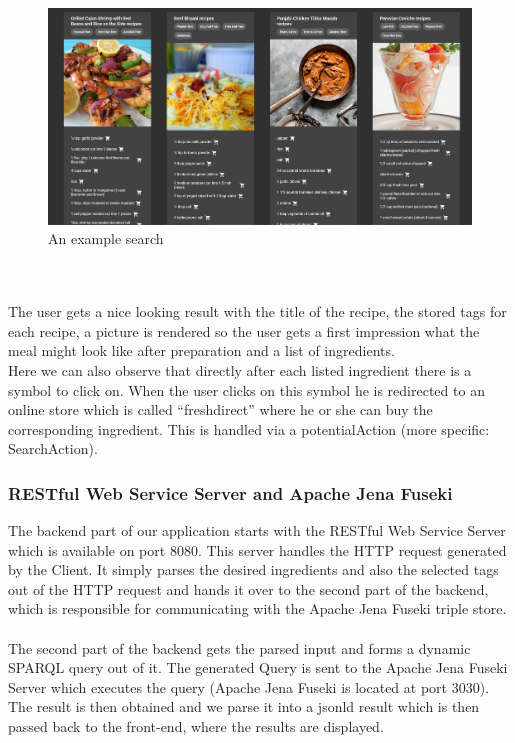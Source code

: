 \documentclass{article}
\begin{document}
\begin{figure}[H]
  \centering
  \includegraphics[width=14cm]{pictures/example_result.png}
  \caption{An example search}
  \label{fig:resp}
\end{figure}
\noindent
\\ \\
The user gets a nice looking result with the title of the recipe, the stored tags for each recipe, a picture is rendered so the user gets a first impression what the meal might look like after preparation and a list of ingredients. \\
Here we can also observe that directly after each listed ingredient there is a symbol to click on. When the user clicks on this symbol he is redirected to an online store which is called ``freshdirect'' where he or she can buy the corresponding ingredient. This is handled via a potentialAction (more specific: SearchAction).

\subsubsection{RESTful Web Service Server and Apache Jena Fuseki}
The backend part of our application starts with the RESTful Web Service Server which is available on port 8080. This server handles the HTTP request generated by the Client. It simply parses the desired ingredients and also the selected tags out of the HTTP request and hands it over to the second part of the backend, which is responsible for communicating with the Apache Jena Fuseki triple store. \\ \\
The second part of the backend gets the parsed input and forms a dynamic SPARQL query out of it. The generated Query is sent to the Apache Jena Fuseki Server which executes the query (Apache Jena Fuseki is located at port 3030). The result is then obtained and we parse it into a jsonld result which is then passed back to the front-end, where the results are displayed.\\
\end{document}
